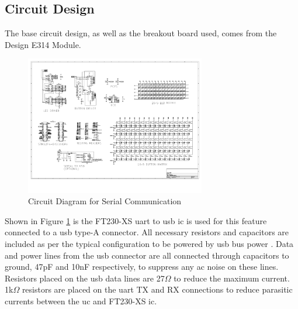 \documentclass[12pt,a4paper]{report}
\begin{document}
\subsection{Circuit Design}
The base circuit design, as well as the breakout board used, comes from the Design E314 Module.
\begin{figure}[h!]
	\centering
	\includegraphics[width = 0.7\textwidth, origin=c, trim={1.75in 1.8in 6in 5.72in}, clip]{../Skripsie/Layout_05042019.pdf}
	\caption{Circuit Diagram for Serial Communication \cite{ft230x}}
	\label{fig:ft230xsCompl}
\end{figure}
Shown in Figure \ref{fig:ft230xsCompl} is the FT230-XS \ac{uart} to \ac{usb} \ac{ic} \cite{ft230x} is used for this feature connected to a \ac{usb} type-A connector. All necessary resistors and capacitors are included as per the typical configuration to be powered by \ac{usb} bus power \cite{ft230x}. Data and power lines from the \ac{usb} connector are all connected through capacitors to ground, 47pF and 10nF respectively, to suppress any \ac{ac} noise on these lines. Resistors placed on the \ac{usb} data lines are 27$\Omega$ to reduce the maximum current. 1k$\Omega$ resistors are placed on the \ac{uart} TX and RX connections to reduce parasitic currents between the \ac{uc} and FT230-XS \ac{ic}.
\end{document}
